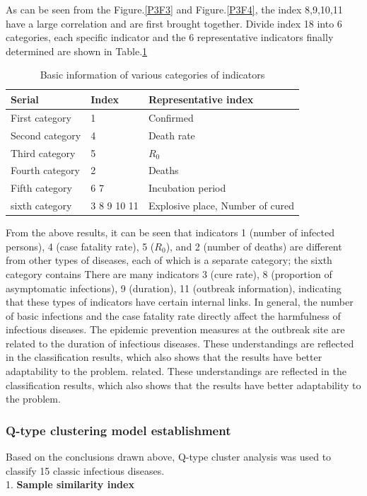 \documentclass[a4paper, 11pt,twoside=true]{scrartcl}
\begin{document}
\noindent As can be seen from the Figure.\ref{P3F3} and Figure.\ref{P3F4}, the index 8,9,10,11 have a large correlation and are first brought together. Divide index 18 into 6 categories, each specific indicator and the 6 representative indicators finally determined are shown in Table.\ref{P3T3}
\begin{table}[H]
	\centering
	\caption{Basic information of various categories of indicators} \label{P3T3}
	\begin{tabular}{lll}
		\hline
		\textbf{Serial} & \textbf{Index} & \textbf{Representative index} \\ \hline
		First category      & 1           & Confirmed           \\
		Second category         & 4           & Death rate            \\
		Third category         & 5           & $R_0$             \\
		Fourth category         & 2           & Deaths           \\
		Fifth category         & 6 7         &  Incubation period           \\
		sixth category         & 3 8 9 10 11 &  Explosive place, Number of cured      \\ \hline
	\end{tabular}
\end{table}

\quad From the above results, it can be seen that indicators 1 (number of infected persons), 4 (case fatality rate), 5 ($R_0$), and 2 (number of deaths) are different from other types of diseases, each of which is a separate category; the sixth category contains There are many indicators 3 (cure rate), 8 (proportion of asymptomatic infections), 9 (duration), 11 (outbreak information), indicating that these types of indicators have certain internal links. In general, the number of basic infections and the case fatality rate directly affect the harmfulness of infectious diseases. The epidemic prevention measures at the outbreak site are related to the duration of infectious diseases. These understandings are reflected in the classification results, which also shows that the results have better adaptability to the problem. related. These understandings are reflected in the classification results, which also shows that the results have better adaptability to the problem.\\

\subsubsection{Q-type clustering model establishment}
\qquad Based on the conclusions drawn above, Q-type cluster analysis was used to classify 15 classic infectious diseases.\\
1. \textbf{Sample similarity index}
\end{document}
